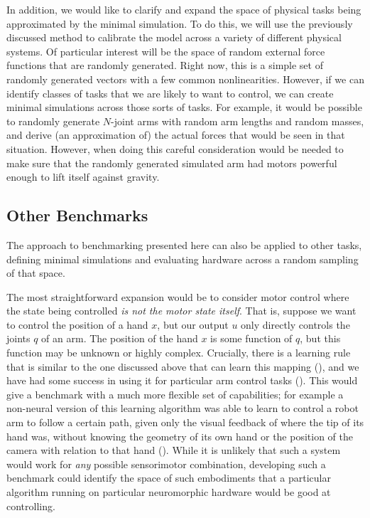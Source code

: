 \documentclass{frontiersSCNS} %
\begin{document}
In addition, we would like to clarify and expand the space of physical tasks
being approximated by the minimal simulation.  To do this, we will use the
previously discussed method to 
calibrate the model across a variety of different physical systems.  Of
particular interest will be the space of random external force functions that
are randomly generated.  Right now, this is a simple set of randomly
generated vectors with a few common nonlinearities.  However, if we can
identify classes of tasks that we are likely to want to control, we can
create minimal simulations across those sorts of tasks.  For example, it
would be possible to randomly generate $N$-joint arms with random arm
lengths and random masses, and derive (an approximation of) the actual forces 
that would be seen in that situation.  However, when doing this careful
consideration would be needed to make sure that the randomly generated simulated arm
had motors powerful enough to lift itself against gravity.

\subsection{Other Benchmarks}

The approach to benchmarking presented here can also be applied to other tasks,
defining minimal simulations and evaluating hardware across a random sampling
of that space.  

The most straightforward expansion would be to consider motor control where
the state being controlled \emph{is not the motor state itself}.  That is,
suppose we want to control the position of a hand $x$, but our output $u$
only directly controls the joints $q$ of an arm.  The position of the hand $x$
is some function of $q$, but this function may be unknown or highly complex.
Crucially, there is a learning rule that is similar to the one discussed above
that can learn this mapping (\citealt{adaptiveJacobian}), and we have had
some success in using it for particular arm control tasks (\citealt{dewolf2014}).
This would give a benchmark with a much more flexible set of capabilities;
for example a non-neural version of this learning algorithm was able to
learn to control a robot arm to follow a certain path, given only the
visual feedback of where the tip of its hand was, without knowing the
geometry of its own hand or the position of the camera with relation to that
hand (\citealt{adaptiveJacobian}).  While it is unlikely that such a
system would work for \emph{any} possible sensorimotor combination, developing
such a benchmark could identify the space of such embodiments that a
particular algorithm running on particular neuromorphic hardware would be
good at controlling.
\end{document}
